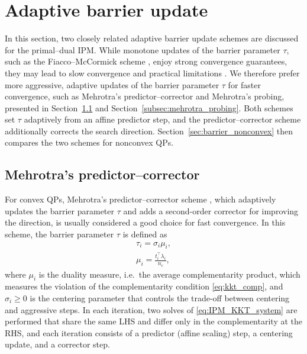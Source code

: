 \documentclass[class=scrbook, crop=false]{standalone}
\begin{document}
\section{Adaptive barrier update}
\label{sec:update}
In this section, two closely related adaptive barrier update schemes are discussed for the primal--dual \gls{IPM}.
While monotone updates of the barrier parameter $\tau$,
such as the Fiacco--McCormick scheme \cite{fiacco1990nonlinear}, enjoy strong convergence guarantees,
they may lead to slow convergence and practical limitations \cite{nocedalAdaptiveBarrierUpdate2009a}.
We therefore prefer more aggressive, adaptive updates of the barrier parameter $\tau$ for faster convergence,
such as Mehrotra's predictor--corrector and Mehrotra's probing, presented in Section~\ref{sec:mehrotra} and Section~\ref{subsec:mehrotra_probing}.
Both schemes set $\tau$ adaptively from an affine predictor step,
and the predictor--corrector scheme additionally corrects the search direction.
Section~\ref{sec:barrier_nonconvex} then compares the two schemes for nonconvex \glspl{QP}.

\subsection{Mehrotra's predictor--corrector}
\label{sec:mehrotra}
For convex \glspl{QP}, 
Mehrotra's predictor--corrector scheme \cite{Mehrotra1992implementation}, 
which adaptively updates the barrier parameter $\tau$ and adds a second-order corrector for improving the direction,
is usually considered a good choice for fast convergence.
In this scheme, the barrier parameter $\tau$ is defined as
\begin{align}
    \tau_i = \sigma_i \mu_i, \\
    \mu_i = \frac{t_i^\top \lambda_i}{n_c},
\end{align}
where $\mu_i$ is the duality measure, i.e.\ the average complementarity product,
which measures the violation of the complementarity condition \eqref{eq:kkt_comp},
and $\sigma_i \geq 0$ is the centering parameter that controls the trade-off between centering and aggressive steps.
In each iteration, two solves of \eqref{eq:IPM_KKT_system} are performed
that share the same \gls{LHS} and differ only in the complementarity at the \gls{RHS}, 
and each iteration consists of a predictor (affine scaling) step, a centering update, and a corrector step.
\end{document}
